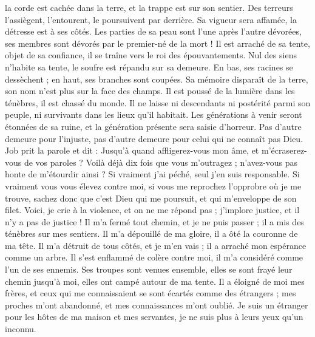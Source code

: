 \begin{multicols}{2}
la corde est cachée dans la terre, et la trappe est sur son sentier.
Des terreurs l'assiègent, l'entourent, le poursuivent par derrière.
Sa vigueur sera affamée, la détresse est à ses côtés.
Les parties de sa peau sont l'une après l'autre dévorées, ses membres sont dévorés par le premier-né de la mort !
Il est arraché de sa tente, objet de sa confiance, il se traîne vers le roi des épouvantements.
Nul des siens n'habite sa tente, le soufre est répandu sur sa demeure.
En bas, ses racines se dessèchent ; en haut, ses branches sont coupées.
Sa mémoire disparaît de la terre, son nom n'est plus sur la face des champs.
Il est poussé de la lumière dans les ténèbres, il est chassé du monde.
Il ne laisse ni descendants ni postérité parmi son peuple, ni survivants dans les lieux qu'il habitait.
Les générations à venir seront étonnées de sa ruine, et la génération présente sera saisie d'horreur.
Pas d'autre demeure pour l'injuste, pas d'autre demeure pour celui qui ne connaît pas Dieu.
\VerseOne{}Job prit la parole et dit :
Jusqu'à quand affligerez-vous mon âme, et m'écraserez-vous de vos paroles ?
Voilà déjà dix fois que vous m'outragez ; n'avez-vous pas honte de m'étourdir ainsi ?
Si vraiment j'ai péché, seul j'en suis responsable.
Si vraiment vous vous élevez contre moi, si vous me reprochez l'opprobre où je me trouve,
sachez donc que c'est Dieu qui me poursuit, et qui m'enveloppe de son filet.
Voici, je crie à la violence, et on ne me répond pas ; j'implore justice, et il n'y a pas de justice !
Il m'a fermé tout chemin, et je ne puis passer ; il a mis des ténèbres sur mes sentiers.
Il m'a dépouillé de ma gloire, il a ôté la couronne de ma tête.
Il m'a détruit de tous côtés, et je m'en vais ; il a arraché mon espérance comme un arbre.
Il s'est enflammé de colère contre moi, il m'a considéré comme l'un de ses ennemis.
Ses troupes sont venues ensemble, elles se sont frayé leur chemin jusqu'à moi, elles ont campé autour de ma tente.
Il a éloigné de moi mes frères, et ceux qui me connaissaient se sont écartés comme des étrangers ;
mes proches m'ont abandonné, et mes connaissances m'ont oublié.
Je suis un étranger pour les hôtes de ma maison et mes servantes, je ne suis plus à leurs yeux qu'un inconnu.

\end{multicols}
